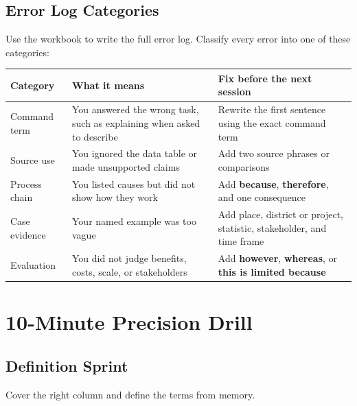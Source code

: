 \documentclass[11pt,a4paper]{article}
\newcommand{\term}[1]{\textcolor{HeadingBlue}{\textbf{#1}}}
\begin{document}
\subsection{Error Log Categories}

Use the workbook to write the full error log. Classify every error into one of
these categories:

\begin{tabularx}{\textwidth}{L{0.23\textwidth}Y Y}
\toprule
\textbf{Category} & \textbf{What it means} & \textbf{Fix before the next session} \\
\midrule
Command term & You answered the wrong task, such as explaining when asked to
describe & Rewrite the first sentence using the exact command term \\
Source use & You ignored the data table or made unsupported claims & Add two
source phrases or comparisons \\
Process chain & You listed causes but did not show how they work & Add
\term{because}, \term{therefore}, and one consequence \\
Case evidence & Your named example was too vague & Add place, district or
project, statistic, stakeholder, and time frame \\
Evaluation & You did not judge benefits, costs, scale, or stakeholders & Add
\term{however}, \term{whereas}, or \term{this is limited because} \\
\bottomrule
\end{tabularx}

\section{10-Minute Precision Drill}

\subsection{Definition Sprint}

Cover the right column and define the terms from memory.
\end{document}
